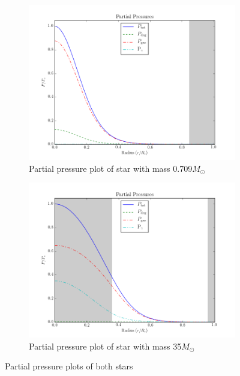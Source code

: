 \documentclass[11pt]{article}
\begin{document}
\begin{figure}[h!]
\centering
\begin{subfigure}{.5\textwidth}
  \centering
  \includegraphics[scale=0.5]{plots/star_comp-_X-0.73,Y-0.25,Z-0.02__Tc-9000000.0/partial_pressure.png}
  \caption{Partial pressure plot of star with mass 0.709$M_\odot$}
  \label{fig:ppsmall}
\end{subfigure}%
\begin{subfigure}{.5\textwidth}
  \centering
  \includegraphics[scale=0.5]{plots/star_comp-_X-0.73,Y-0.25,Z-0.02__Tc-33000000.0/partial_pressure.png}
  \caption{Partial pressure plot of star with mass 35$M_\odot$}
  \label{fig:ppbig}
\end{subfigure}
\caption{Partial pressure plots of both stars}
\label{fig:pp}
\end{figure}
\end{document}
